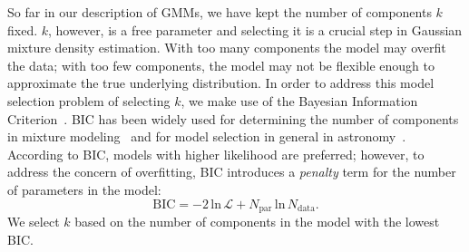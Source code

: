 \documentclass[12pt, letterpaper, preprint]{aastex}
\newcommand{\beq}{\begin{equation}}
\newcommand{\eeq}{\end{equation}}
\begin{document}

So far in our description of GMMs, we have kept
the number of components $k$ fixed. $k$, however, is a free 
parameter and selecting it is a crucial step in Gaussian mixture
density estimation. With too many components the model may overfit 
the data; with too few components, 
the model may not be flexible enough to approximate the true 
underlying distribution. In order to address this model selection problem
of selecting $k$, we make use of the Bayesian Information 
Criterion~\citep[BIC;][]{schwarz1978}. BIC has been widely used for 
determining the number of components in mixture 
modeling~\citep[\emph{e.g.}][]{leroux1992,roeder1997,fraley1998,steele2010performance}
and for model selection in general in 
astronomy~\citep[\emph{e.g.}][]{liddle2007,broderick2011,wilkinson2015,vakili2016}.
According to BIC, models with higher likelihood are preferred; however, 
to address the concern of overfitting, BIC introduces a \emph{penalty} term 
for the number of parameters in the model: 
\beq \label{eq:bic}
\mathrm{BIC} = -2\,\mathrm{ln}\,\mathcal{L} + N_\mathrm{par}\,\mathrm{ln}\,N_\mathrm{data}.
\eeq
We select $k$ based on the number of components in the model with the 
lowest BIC. 

\end{document}
